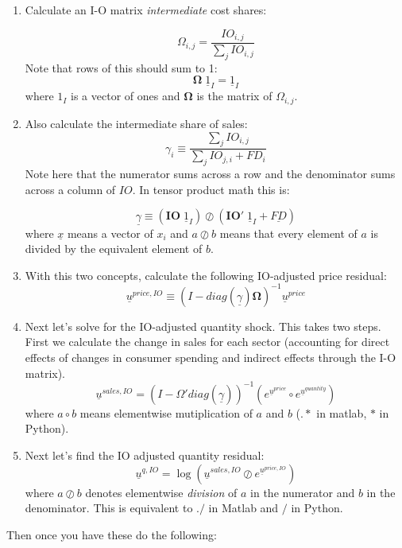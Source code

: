\documentclass[12pt,english]{article}
\begin{document}
\begin{enumerate}
	\item Calculate an I-O matrix \emph{intermediate} cost shares:
	
	\[
		\Omega_{i,j} = \frac{IO_{i,j}}{\sum_{j} IO_{i,j}}
	\]
	Note that rows of this should sum to 1:
	\[
		\mathbf{\Omega}\; \underline{1}_{I}=\underline{1}_I
	\]
	where $1_I$ is a vector of ones and $\mathbf{\Omega}$ is the matrix of $\Omega_{i,j}$.
	\item Also calculate the intermediate share of sales:
	\[
		\gamma_{i}\equiv \frac{\sum_j IO_{i,j}}{\sum_j IO_{j,i}+FD_i}
	\]
	Note here that the numerator sums across a row and the denominator sums across a column of $IO$. In tensor product math this is:
	
	\[
		\underline{\gamma}\equiv (\mathbf{IO}\;\underline{1}_I)\oslash (\mathbf{IO}'\;\underline{1}_I+\underline{FD})
	\]
	where $\underline{x}$ means a vector of $x_i$ and $a \oslash b$ means that every element of $a$ is divided by the equivalent element of $b$.
	
	\item With this two concepts, calculate the following IO-adjusted price residual:
	\[
		\underline{u}^{price,IO}\equiv (I-diag(\underline{\gamma})\mathbf{\Omega})^{-1}\underline{u}^{price}
	\]
	\item Next let's solve for the IO-adjusted quantity shock. This takes two steps. First we calculate the change in sales for each sector (accounting for direct effects of changes in consumer spending and indirect effects through the I-O matrix). 
	\[
		\underline{u}^{sales,IO} = (I-\Omega'diag(\underline{\gamma}))^{-1}(e^{\underline{u}^{price}}\circ e^{\underline{u}^{quantity}})
	\]
	where $a\circ b$ means elementwise mutiplication of $a$ and $b$ ($.*$ in matlab, $*$ in Python).
	\item Next let's find the IO adjusted quantity residual:
	\[
		\underline{u}^{q,IO} = \log\left(\underline{u}^{sales,IO}\oslash e^{\underline{u}^{price,IO}}\right)
	\]
	where $a \oslash b$ denotes elementwise \emph{division} of $a$ in the numerator and $b$ in the denominator. This is equivalent to $./$ in Matlab and $/$ in Python.
\end{enumerate}

Then once you have these do the following:
\end{document}
